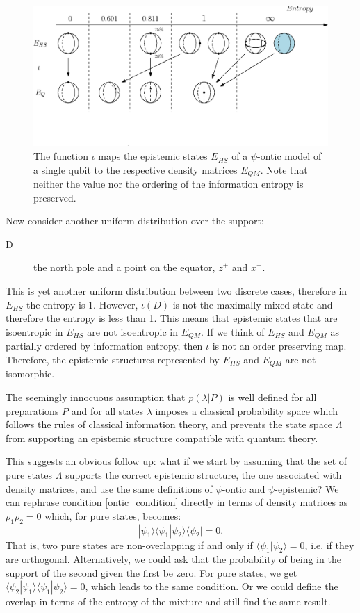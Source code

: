 \documentclass[twocolumn,prl,floatfix,superscriptaddress]{revtex4-2}
\begin{document}
\begin{figure}
\includegraphics[scale=.4]{fig2}
\caption{\footnotesize{The function $\iota$ maps the epistemic states $E_{HS}$ of a $\psi$-ontic model of a single qubit to the respective density matrices $E_{QM}$. Note that neither the value nor the ordering of the information entropy is preserved.}}\label{fig_map}
\end{figure}

Now consider another uniform distribution over the support:
\begin{description}
	\item[D] the north pole and a point on the equator, $z^+$ and $x^+$.
\end{description}
This is yet another uniform distribution between two discrete cases, therefore in $E_{HS}$ the entropy is 1. However, $\iota(D)$ is not the maximally mixed state and therefore the entropy is less than 1. This means that epistemic states that are isoentropic in $E_{HS}$ are not isoentropic in $E_{QM}$. If we think of $E_{HS}$ and $E_{QM}$ as partially ordered by information entropy, then $\iota$ is not an order preserving map. Therefore, the epistemic structures represented by $E_{HS}$ and $E_{QM}$ are not isomorphic.

The seemingly innocuous assumption that $p(\lambda|P)$ is well defined for all preparations $P$ and for all states $\lambda$ imposes a classical probability space which follows the rules of classical information theory, and prevents the state space $\Lambda$ from supporting an epistemic structure compatible with quantum theory. 

This suggests an obvious follow up: what if we start by assuming that the set of pure states $\Lambda$ supports the correct epistemic structure, the one associated with density matrices, and use the same definitions of $\psi$-ontic and $\psi$-epistemic? We can rephrase condition \ref{ontic_condition} directly in terms of density matrices as $\rho_1 \rho_2 = 0$ which, for pure states, becomes:
\begin{equation}
	|\psi_1\rangle\langle\psi_1|\psi_2\rangle\langle\psi_2| = 0.
\end{equation}
That is, two pure states are non-overlapping if and only if $\langle\psi_1|\psi_2\rangle=0$, i.e. if they are orthogonal. Alternatively, we could ask that the probability of being in the support of the second given the first be zero. For pure states, we get $\langle\psi_2|\psi_1\rangle\langle\psi_1|\psi_2\rangle = 0$, which leads to the same condition. Or we could define the overlap in terms of the entropy of the mixture and still find the same result.
\end{document}
